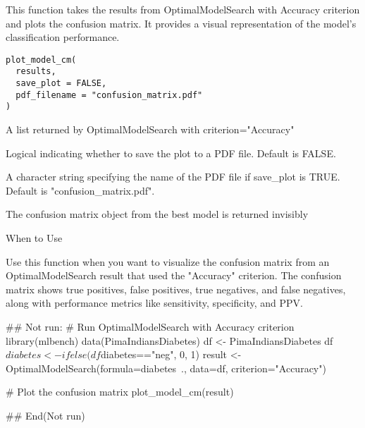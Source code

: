 \documentclass[a4paper]{book}
\begin{document}
%
\begin{Description}
This function takes the results from OptimalModelSearch with Accuracy criterion
and plots the confusion matrix. It provides a visual representation of the model's
classification performance.
\end{Description}
%
\begin{Usage}
\begin{verbatim}
plot_model_cm(
  results,
  save_plot = FALSE,
  pdf_filename = "confusion_matrix.pdf"
)
\end{verbatim}
\end{Usage}
%
\begin{Arguments}
\begin{ldescription}
\item[\code{results}] A list returned by OptimalModelSearch with criterion="Accuracy"

\item[\code{save\_plot}] Logical indicating whether to save the plot to a PDF file. Default is FALSE.

\item[\code{pdf\_filename}] A character string specifying the name of the PDF file if
save\_plot is TRUE. Default is "confusion\_matrix.pdf".
\end{ldescription}
\end{Arguments}
%
\begin{Value}
The confusion matrix object from the best model is returned invisibly
\end{Value}
%
\begin{Section}{When to Use}

Use this function when you want to visualize the confusion matrix from an OptimalModelSearch
result that used the "Accuracy" criterion. The confusion matrix shows true positives, 
false positives, true negatives, and false negatives, along with performance metrics like 
sensitivity, specificity, and PPV.
\end{Section}
%
\begin{Examples}
\begin{ExampleCode}
## Not run: 
# Run OptimalModelSearch with Accuracy criterion
library(mlbench)
data(PimaIndiansDiabetes)
df <- PimaIndiansDiabetes
df$diabetes <- ifelse(df$diabetes=="neg", 0, 1)
result <- OptimalModelSearch(formula=diabetes~., data=df, criterion="Accuracy")

# Plot the confusion matrix
plot_model_cm(result)

## End(Not run)
\end{ExampleCode}
\end{Examples}
\end{document}
